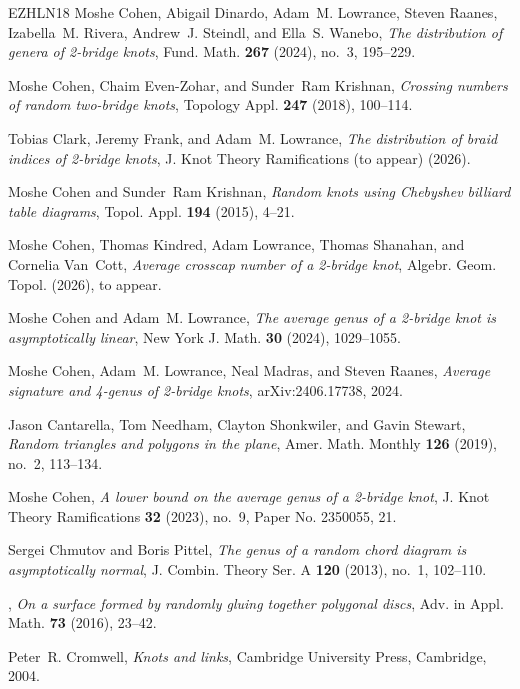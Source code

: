 \documentclass[11pt]{amsart}
\theoremstyle{definition}
\theoremstyle{remark}
\numberwithin{equation}{section}
\begin{document}
\begin{thebibliography}{EZHLN18}
Moshe Cohen, Abigail Dinardo, Adam~M. Lowrance, Steven Raanes, Izabella~M.
  Rivera, Andrew~J. Steindl, and Ella~S. Wanebo, \emph{The distribution of
  genera of 2-bridge knots}, Fund. Math. \textbf{267} (2024), no.~3, 195--229.

Moshe Cohen, Chaim Even-Zohar, and Sunder~Ram Krishnan, \emph{Crossing numbers
  of random two-bridge knots}, Topology Appl. \textbf{247} (2018), 100--114.

Tobias Clark, Jeremy Frank, and Adam~M. Lowrance, \emph{The distribution of
  braid indices of 2-bridge knots}, J. Knot Theory Ramifications (to appear)
  (2026).

Moshe Cohen and Sunder~Ram Krishnan, \emph{Random knots using {C}hebyshev
  billiard table diagrams}, Topol. Appl. \textbf{194} (2015), 4--21.

Moshe Cohen, Thomas Kindred, Adam Lowrance, Thomas Shanahan, and Cornelia
  Van~Cott, \emph{Average crosscap number of a 2-bridge knot}, Algebr. Geom.
  Topol. (2026), to appear.

Moshe Cohen and Adam~M. Lowrance, \emph{The average genus of a 2-bridge knot is
  asymptotically linear}, New York J. Math. \textbf{30} (2024), 1029--1055.

Moshe Cohen, Adam~M. Lowrance, Neal Madras, and Steven Raanes, \emph{Average
  signature and 4-genus of 2-bridge knots}, arXiv:2406.17738, 2024.

Jason Cantarella, Tom Needham, Clayton Shonkwiler, and Gavin Stewart,
  \emph{Random triangles and polygons in the plane}, Amer. Math. Monthly
  \textbf{126} (2019), no.~2, 113--134.

Moshe Cohen, \emph{A lower bound on the average genus of a 2-bridge knot}, J.
  Knot Theory Ramifications \textbf{32} (2023), no.~9, Paper No. 2350055, 21.

Sergei Chmutov and Boris Pittel, \emph{The genus of a random chord diagram is
  asymptotically normal}, J. Combin. Theory Ser. A \textbf{120} (2013), no.~1,
  102--110.

\bysame, \emph{On a surface formed by randomly gluing together polygonal
  discs}, Adv. in Appl. Math. \textbf{73} (2016), 23--42.

Peter~R. Cromwell, \emph{Knots and links}, Cambridge University Press,
  Cambridge, 2004.


\end{thebibliography}
\end{document}
